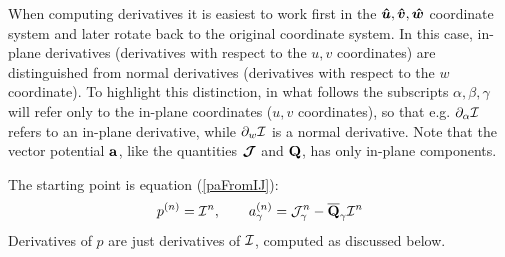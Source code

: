 \documentclass[letterpaper]{article}
\begin{document}
When computing derivatives it is easiest to work first
in the $\boldsymbol{\hat{u}},\boldsymbol{\hat{v}},\boldsymbol{\hat{w}}$ coordinate system 
and later rotate back to the original coordinate system.
In this case, in-plane derivatives (derivatives with respect
to the $u,v$ coordinates) are distinguished from 
normal derivatives (derivatives with respect to the $w$ 
coordinate).
To highlight this distinction, in what follows the subscripts 
$\alpha,\beta,\gamma$ will refer only to the in-plane coordinates
($u,v$ coordinates), so that e.g. $\partial_\alpha \mathcal{I}$ refers 
to an in-plane derivative, while $\partial_w \mathcal{I}$ is a 
normal derivative. Note that the vector potential $\mathbf{a}$, 
like the quantities $\boldsymbol{\mathcal{J}}$ and $\mathbf{Q}$, has only
in-plane components.

The starting point is equation (\ref{paFromIJ}):
$$ p^{(n)} = \mathcal{I}^n, 
   \qquad 
   a_\gamma^{(n)} = \mathcal{J}^n_\gamma - \overline{\mathbf{Q}}_\gamma \mathcal{I}^n
$$
Derivatives of $p$ are just derivatives of $\mathcal{I}$,
computed as discussed below.
\end{document}
